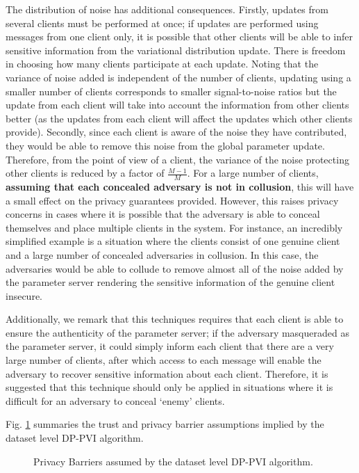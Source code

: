 The distribution of noise has additional consequences. Firstly, updates from several clients must be performed at once; if updates are performed using messages from one client only, it is possible that other clients will be able to infer sensitive information from the variational distribution update. There is freedom in choosing how many clients participate at each update. Noting that the variance of noise added is independent of the number of clients, updating using a smaller number of clients corresponds to smaller signal-to-noise ratios but the update from each client will take into account the information from other clients better (as the updates from each client will affect the updates which other clients provide). Secondly, since each client is aware of the noise they have contributed, they would be able to remove this noise from the global parameter update. Therefore, from the point of view of a client, the variance of the noise protecting other clients is reduced by a factor of $\frac{M-1}{M}$. For a large number of clients, \textbf{assuming that each concealed adversary is not in collusion}, this will have a small effect on the privacy guarantees provided. However, this raises privacy concerns in cases where it is possible that the adversary is able to conceal themselves and place multiple clients in the system. For instance, an incredibly simplified example is a situation where the clients consist of one genuine client and a large number of concealed adversaries in collusion. In this case, the adversaries would be able to collude to remove almost all of the noise added by the parameter server rendering the sensitive information of the genuine client insecure. 

Additionally, we remark that this techniques requires that each client is able to ensure the authenticity of the parameter server; if the adversary masqueraded as the parameter server, it could simply inform each client that there are a very large number of clients, after which access to each message will enable the adversary to recover sensitive information about each client. Therefore, it is suggested that this technique should only be applied in situations where it is difficult for an adversary to conceal `enemy' clients.

Fig. \ref{fig:design:datasetBarrier} summaries the trust and privacy barrier assumptions implied by the dataset level DP-PVI algorithm. 

\begin{figure}
	\centering
	
	\caption{Privacy Barriers assumed by the dataset level DP-PVI algorithm. }
	\label{fig:design:datasetBarrier}
\end{figure}

